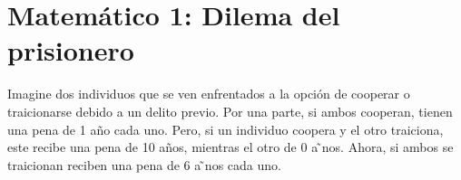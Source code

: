 \documentclass{exam}
\begin{document}
\begin{enumerate}[label=(\alph*)]
\begin{solution}
\begin{center}
    
\end{center}

    \end{solution}
\end{enumerate}

\newpage
\section{Matemático 1: Dilema del prisionero}
Imagine dos individuos que se ven enfrentados a la opción de cooperar o traicionarse debido a un delito previo. Por una parte, si ambos cooperan, tienen una pena de 1 año cada uno. Pero, si un individuo coopera y el otro traiciona, este recibe una pena de 10 años, mientras el otro de 0 a ̃nos. Ahora, si ambos se traicionan reciben una pena de 6 a ̃nos cada uno.
\end{document}
